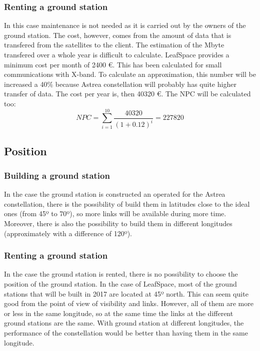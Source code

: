 \subsubsection{Renting a ground station}
In this case maintenance is not needed as it is carried out by the owners of the ground station. The cost, however, comes from the amount of data that is transfered from the satellites to the client. The estimation of the Mbyte transfered over a whole year is difficult to calculate. LeafSpace provides a minimum cost per month of 2400 \euro . This has been calculated for small communications  with X-band. To calculate an approximation, this number will be increased a 40\% because Astrea constellation will probably has quite higher transfer of data. The cost per year is, then 40320 \euro. The NPC will be calculated too: 
\begin{equation}
NPC=\sum_{i=1}^{10} \frac{40320}{(1+0.12)^i}=227820 
\end{equation}

\subsection{Position}

\subsubsection{Building a ground station}
In the case the ground station is constructed an operated for the Astrea constellation, there is the possibility of build them in latitudes close to the ideal ones (from 45º to 70º), so more links will be available during more time. Moreover, there is also the possibility to build them in different longitudes (approximately with a difference of 120º).

\subsubsection{Renting a ground station}
In the case the ground station is rented, there is no possibility to choose the position of the ground station. In the case of LeafSpace, most of the ground stations that will be built in 2017 are located at 45º north. This can seem quite good from the point of view of visibility and links. However, all of them are more or less in the same longitude, so at the same time the links at the different ground stations are the same. With ground station at different longitudes, the performance of the constellation would be better than having them in the same longitude.

